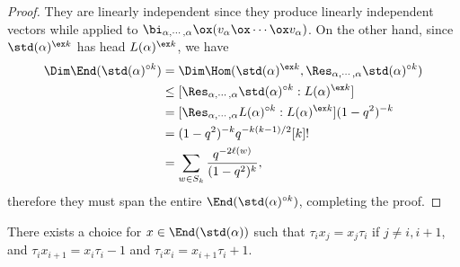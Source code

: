 \begin{proof}
    They are linearly independent since they produce linearly independent
    vectors while applied to $\bi_{\alpha,\cdots,\alpha}\ox
    (v_\alpha\ox\cdots\ox v_\alpha)$. On the other hand, since
    $\std(\alpha)^{\ex k}$ has head $L(\alpha)^{\ex k}$, we have
    \[
    \begin{aligned}
        \Dim\End(\std(\alpha)^{\circ k})
        & = \Dim\Hom(\std(\alpha)^{\ex k},
        \Res_{\alpha,\cdots,\alpha}\std(\alpha)^{\circ k})\\
        &\le[\Res_{\alpha,\cdots,\alpha}\std(\alpha)^{\circ k}
        :L(\alpha)^{\ex k}]\\
        & = [\Res_{\alpha,\cdots,\alpha}L(\alpha)^{\circ k}
        :L(\alpha)^{\ex k}](1-q^2)^{-k}\\
        & = (1-q^2)^{-k}q^{-k(k-1)/2}[k]!\\
        & = \sum_{w\in S_k}\dfrac{q^{-2\ell(w)}}{(1-q^2)^k},
    \end{aligned}
    \]
    therefore they must span the entire $\End(\std(\alpha)^{\circ k})$,
    completing the proof.
\end{proof}

\begin{lemma}
    There exists a choice for $x\in\End(\std(\alpha))$ such that
    $\tau_i x_j = x_j\tau_i$ if $j\ne i,i+1$, and $\tau_i x_{i+1}
     = x_i\tau_i-1$ and $\tau_i x_i = x_{i+1}\tau_i+1$.
\end{lemma}

